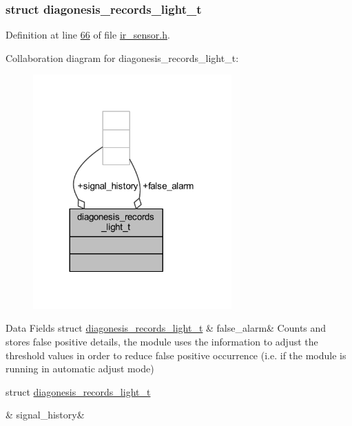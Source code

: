 \subsubsection{struct diagonesis\+\_\+records\+\_\+light\+\_\+t}


Definition at line \hyperlink{a00017_source_l00066}{66} of file \hyperlink{a00017_source}{ir\+\_\+sensor.\+h}.



Collaboration diagram for diagonesis\+\_\+records\+\_\+light\+\_\+t\+:\nopagebreak
\begin{figure}[H]
\begin{center}
\leavevmode
\includegraphics[width=216pt]{d3/dd1/a00914}
\end{center}
\end{figure}
\begin{DoxyFields}{Data Fields}
\hypertarget{a00017_a799f50625c0c03f9404a59287810113d}{struct \hyperlink{a00017_d6/db8/a00376}{diagonesis\+\_\+records\+\_\+light\+\_\+t}}\label{a00017_a799f50625c0c03f9404a59287810113d}
&
false\+\_\+alarm&
Counts and stores false positive details, the module uses the information to adjust the threshold values in order to reduce false positive occurrence (i.\+e. if the module is running in automatic adjust mode) \\
\hline

\hypertarget{a00017_affb63906d23cb1cb7787d61eaaedfb60}{struct \hyperlink{a00017_d8/d95/a00379}{diagonesis\+\_\+records\+\_\+light\+\_\+t}}\label{a00017_affb63906d23cb1cb7787d61eaaedfb60}
&
signal\+\_\+history&
\\
\hline

\end{DoxyFields}
\label{d8/d7f/a00787}
\hypertarget{a00017_d8/d7f/a00787}{}
